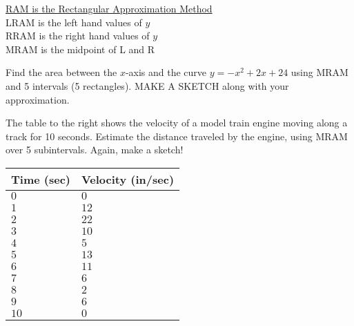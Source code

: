 \begin{questions}
    
    \begin{center}
        \underline{RAM is the Rectangular Approximation Method}\\
        LRAM is the left hand values of $y$\\
        RRAM is the right hand values of $y$\\
        MRAM is the midpoint of L and R
    \end{center}
    
    
    \newpage
    
    \question Find the area between the $x$-axis and the curve $y=-x^2+2x+24$ using MRAM and 5 intervals (5 rectangles). MAKE A SKETCH along with your approximation.
    
    
    \begin{minipage}[t]{0.55\linewidth}
    \question The table to the right shows the velocity of a model train engine moving along a track for 10 seconds. Estimate the distance traveled by the engine, using MRAM over 5 subintervals. Again, make a sketch!    
    \end{minipage}
    \hfill
    \begin{minipage}[t]{0.4\linewidth}
    \begin{longtable}[ht]{|C{2.25cm}|C{3cm}|}
        \hline
        Time (sec)\Tstrut\Bstrut & Velocity (in/sec)\Tstrut\Bstrut \\\hline
        $0$\Tstrut\Bstrut & $0$\Tstrut\Bstrut \\\hline
        $1$\Tstrut\Bstrut & $12$\Tstrut\Bstrut \\\hline
        $2$\Tstrut\Bstrut & $22$\Tstrut\Bstrut \\\hline
        $3$\Tstrut\Bstrut & $10$\Tstrut\Bstrut \\\hline
        $4$\Tstrut\Bstrut & $5$\Tstrut\Bstrut \\\hline 
        $5$\Tstrut\Bstrut & $13$\Tstrut\Bstrut \\\hline
        $6$\Tstrut\Bstrut & $11$\Tstrut\Bstrut \\\hline
        $7$\Tstrut\Bstrut & $6$\Tstrut\Bstrut \\\hline
        $8$\Tstrut\Bstrut & $2$\Tstrut\Bstrut \\\hline
        $9$\Tstrut\Bstrut & $6$\Tstrut\Bstrut \\\hline
        $10$\Tstrut\Bstrut & $0$\Tstrut\Bstrut \\\hline
    \end{longtable}    
    \end{minipage}
    


\end{questions}
